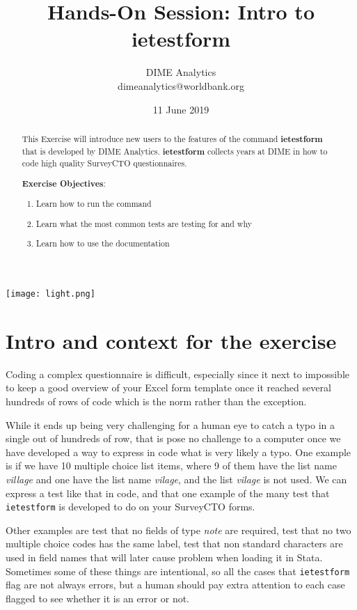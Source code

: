 \documentclass{tufte-handout}
\title{Hands-On Session: Intro to ietestform}
\author{DIME Analytics \\ dimeanalytics@worldbank.org}
\date{11 June 2019}  %
\begin{document}
\maketitle%

\begin{marginfigure}%
  \texttt{[image: light.png]}
\end{marginfigure}

\begin{abstract}
This Exercise will introduce new users to the features of the command \textbf{ietestform} that is developed by DIME Analytics. \textbf{ietestform} collects years at DIME in how to code high quality SurveyCTO questionnaires.


\bigskip\noindent \textbf{Exercise Objectives}:
\begin{enumerate}
  \item Learn how to run the command
  \item Learn what the most common tests are testing for and why
  \item Learn how to use the documentation 
\end{enumerate}
\end{abstract}

\section{Intro and context for the exercise}

	Coding a complex questionnaire is difficult, especially since it next to impossible to keep a good overview of your Excel form template once it reached several hundreds of rows of code which is the norm rather than the exception.
	
	While it ends up being very challenging for a human eye to catch a typo in a single out of hundreds of row, that is pose no challenge to a computer once we have developed a way to express in code what is very likely a typo. One example is if we have 10 multiple choice list items, where 9 of them have the list name \textit{village} and one have the list name \textit{vilage}, and the list \textit{vilage} is not used. We can express a test like that in code, and that one example of the many test that \verb|ietestform| is developed to do on your SurveyCTO forms.
	
	Other examples are test that no fields of type \textit{note} are required, test that no two multiple choice codes has the same label, test that non standard characters are used in field names that will later cause problem when loading it in Stata. Sometimes some of these things are intentional, so all the cases that \verb|ietestform| flag are not always errors, but a human should pay extra attention to each case flagged to see whether it is an error or not.
\end{document}
